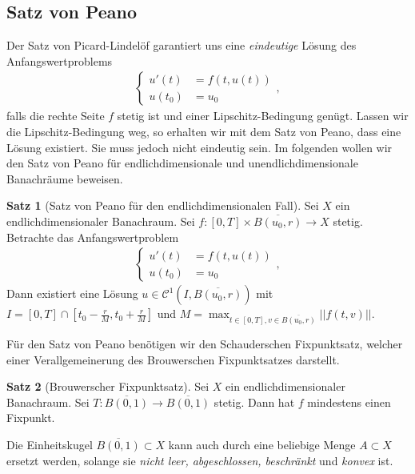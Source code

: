 \documentclass[a4paper]{article}
\theoremstyle{definition}
\newtheorem{theorem}{Satz}
\begin{document}
\subsection{Satz von Peano}
Der Satz von Picard-Lindelöf garantiert uns eine \emph{eindeutige} Lösung des Anfangswertproblems
\begin{align*}
    \begin{cases}
        u'(t)  &= f(t,u(t)) \\
        u(t_0) &= u_0
    \end{cases},
\end{align*}
falls die rechte Seite $f$ stetig ist und einer Lipschitz-Bedingung genügt. Lassen wir die Lipschitz-Bedingung weg, so erhalten wir mit dem Satz von Peano, dass eine Lösung existiert. Sie muss jedoch nicht eindeutig sein. Im folgenden wollen wir den Satz von Peano für endlichdimensionale und unendlichdimensionale Banachräume beweisen.

\begin{theorem}[Satz von Peano für den endlichdimensionalen Fall]
    Sei $X$ ein endlichdimensionaler Banachraum. Sei $f: [0,T] \times\overline{ B(u_0,r)} \to X$ stetig. Betrachte das Anfangswertproblem
    \begin{align*}
        \begin{cases}
            u'(t)  &= f(t,u(t)) \\
            u(t_0) &= u_0
        \end{cases},
    \end{align*}
    Dann existiert eine Lösung $u \in \mathcal{C}^1(I, \overline{ B(u_0,r)})$ mit $I = [0,T] \cap [t_0 - \frac{r}{M}, t_0 + \frac{r}{M}]$ und $M = \max_{t \in [0,T], v \in \overline{ B(u_0,r)}}||f(t,v)||$.
\end{theorem}

Für den Satz von Peano benötigen wir den Schauderschen Fixpunktsatz, welcher einer Verallgemeinerung des Brouwerschen Fixpunktsatzes darstellt. 

\begin{theorem}[Brouwerscher Fixpunktsatz]
    Sei $X$ ein endlichdimensionaler Banachraum. Sei $T: \overline{B(0,1)} \to \overline{B(0,1)}$ stetig. Dann hat $f$ mindestens einen Fixpunkt.
\end{theorem}

Die Einheitskugel $\overline{B(0,1)} \subset X$ kann auch durch eine beliebige Menge $A \subset X$ ersetzt werden, solange sie \emph{nicht leer, abgeschlossen, beschränkt} und \emph{konvex} ist. 
\end{document}
